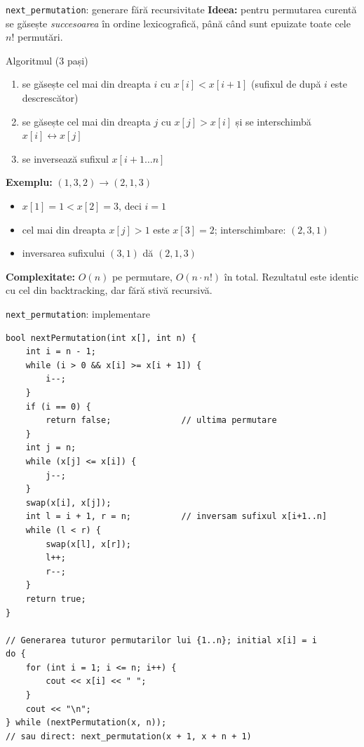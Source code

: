 \documentclass[8pt,mathserif]{beamer}
\begin{document}
\begin{frame}{\texttt{next\_permutation}: generare fără recursivitate}
  \textbf{Ideea:} pentru permutarea curentă se găsește \textit{succesoarea} în ordine lexicografică, până când sunt epuizate toate cele $n!$ permutări.
  \begin{block}{Algoritmul (3 pași)}
    \begin{enumerate}
      \item se găsește cel mai din dreapta $i$ cu $x[i] < x[i+1]$ (sufixul de după $i$ este descrescător)
      \item se găsește cel mai din dreapta $j$ cu $x[j] > x[i]$ și se interschimbă $x[i] \leftrightarrow x[j]$
      \item se inversează sufixul $x[i+1 \ldots n]$
    \end{enumerate}
  \end{block}
  \smallskip
  \textbf{Exemplu:} $(1,3,2) \rightarrow (2,1,3)$
  \begin{itemize}
    \item $x[1] = 1 < x[2] = 3$, deci $i = 1$
    \item cel mai din dreapta $x[j] > 1$ este $x[3] = 2$; interschimbare: $(2,3,1)$
    \item inversarea sufixului $(3,1)$ dă $(2,1,3)$
  \end{itemize}
  \smallskip
  \textbf{Complexitate:} $O(n)$ pe permutare, $O(n \cdot n!)$ în total. \alert{Rezultatul este identic cu cel din backtracking, dar fără stivă recursivă.}
\end{frame}

\begin{frame}[fragile]{\texttt{next\_permutation}: implementare}
  \lstset{basicstyle=\ttfamily\footnotesize}
  \begin{lstlisting}
bool nextPermutation(int x[], int n) {
    int i = n - 1;
    while (i > 0 && x[i] >= x[i + 1]) {
        i--;
    }
    if (i == 0) {
        return false;              // ultima permutare
    }
    int j = n;
    while (x[j] <= x[i]) {
        j--;
    }
    swap(x[i], x[j]);
    int l = i + 1, r = n;          // inversam sufixul x[i+1..n]
    while (l < r) {
        swap(x[l], x[r]);
        l++;
        r--;
    }
    return true;
}

// Generarea tuturor permutarilor lui {1..n}; initial x[i] = i
do {
    for (int i = 1; i <= n; i++) {
        cout << x[i] << " ";
    }
    cout << "\n";
} while (nextPermutation(x, n));
// sau direct: next_permutation(x + 1, x + n + 1)
  \end{lstlisting}
\end{frame}
\end{document}

